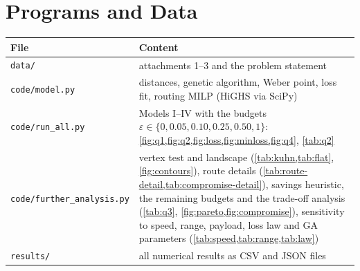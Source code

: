 \documentclass[11pt,a4paper]{article}
\theoremstyle{definition}
\begin{document}
\section{Programs and Data}\label{app:programs}

\begin{center}
\small
\begin{tabular}{lp{}}
\toprule
File & Content \\
\midrule
\texttt{data/} & attachments 1--3 and the problem statement \\
\texttt{code/model.py} & distances, genetic algorithm, Weber point, loss fit, routing MILP (HiGHS via SciPy) \\
\texttt{code/run\_all.py} & Models I--IV with the budgets $\varepsilon\in\{0,0.05,0.10,0.25,0.50,1\}$: \cref{fig:q1,fig:q2,fig:loss,fig:minloss,fig:q4}, \cref{tab:q2} \\
\texttt{code/further\_analysis.py} & vertex test and landscape (\cref{tab:kuhn,tab:flat}, \cref{fig:contours}), route details (\cref{tab:route-detail,tab:compromise-detail}), savings heuristic, the remaining budgets and the trade-off analysis (\cref{tab:q3}, \cref{fig:pareto,fig:compromise}), sensitivity to speed, range, payload, loss law and GA parameters (\cref{tab:speed,tab:range,tab:law}) \\
\texttt{results/} & all numerical results as CSV and JSON files \\
\bottomrule
\end{tabular}
\end{center}
\end{document}
